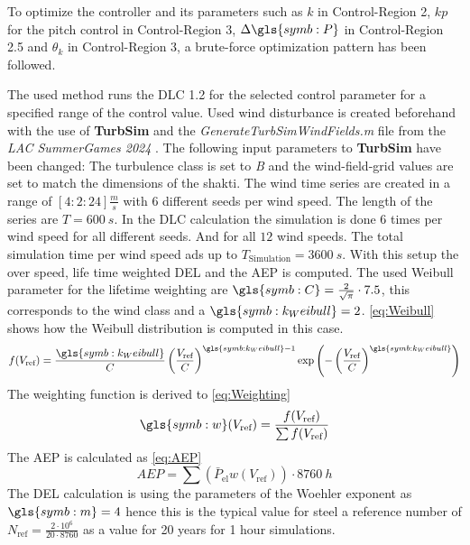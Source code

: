 To optimize the controller and its parameters such as $k$ in Control-Region 2, $kp$ for the pitch control in Control-Region 3, $\Delta \gls{symb:P}$ in  Control-Region 2.5 and $\theta_k$ in Control-Region 3, a brute-force optimization pattern has been followed.

The used method runs the \gls{DLC} 1.2 for the selected control parameter for a specified range of the control value. 
Used wind disturbance is created beforehand with the use of \textbf{TurbSim} and the \textit{GenerateTurbSimWindFields.m} file from the \textit{LAC SummerGames 2024} \cite{SummerGames}. 
The following input parameters to \textbf{TurbSim} have been changed: The turbulence class is set to \textit{B} and the wind-field-grid values are set to match the dimensions of the \gls{shakti}. 
The wind time series are created in a range of $[4:2:24]\frac{m}{s}$ with $6$ different seeds per wind speed. 
The length of the series are $T = \SI{600}{s}$. 
In the \gls{DLC} calculation the simulation is done $6$ times per wind speed for all different seeds. And for all $12$ wind speeds. The total simulation time per wind speed ads up to $T_{\text{Simulation}} = \SI{3600}{s}$. 
With this setup the over speed, life time weighted \gls{DEL} and the \gls{AEP} is computed. 
The used Weibull parameter for the lifetime weighting are $\gls{symb:C} = \frac{2}{\sqrt{\pi}}\cdot7.5$, this corresponds to the wind class \MakeUppercase{} \cite{IEC61400-1} and a $\gls{symb:k_Weibull} = 2$. 
\ref{eq:Weibull} shows how the Weibull distribution is computed in this case.
\begin{equation}
	f(V_{\text{ref}}) = \frac{\gls{symb:k_Weibull}}{C}\left(\frac{V_{\text{ref}}}{C}\right)^{\gls{symb:k_Weibull}-1} \exp\left(-\left(\frac{V_{\text{ref}}}{C}\right)^{\gls{symb:k_Weibull}}\right)
	\label{eq:Weibull}
\end{equation}
The weighting function is derived to \ref{eq:Weighting}
\begin{equation}
	\gls{symb:w}(V_{\text{ref}}) = \frac{f(V_{\text{ref}})}{\sum f(V_{\text{ref}})}
	\label{eq:Weighting}
\end{equation}
The \gls{AEP} is calculated as \ref{eq:AEP}
\begin{equation}
	AEP = \sum \left(\bar{P}_{\text{el}}w(V_{\text{ref}})\right)\cdot \SI{8760}{h}
	\label{eq:AEP}
\end{equation}
The DEL calculation is using the parameters of the Woehler exponent as $\gls{symb:m} = 4$ hence this is the typical value for steel a reference number of $N_{\text{ref}} = \frac{2\cdot10^6}{20\cdot8760}$ as a value for 20 years for 1 hour simulations.
